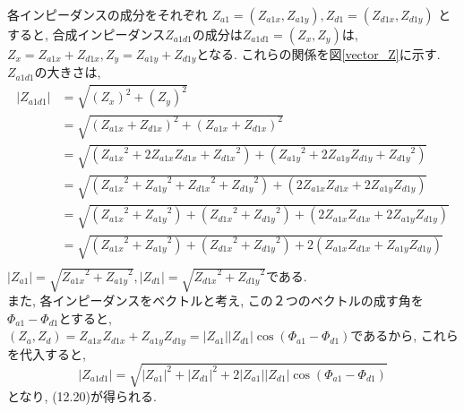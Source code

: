 \documentclass[fleqn,11pt,a4paper,dvipdfmx]{jsarticle}
\numberwithin{equation}{section}
\begin{document}
各インピーダンスの成分をそれぞれ
$Z_{a1} = \left(Z_{a1x} , Z_{a1y}\right) , Z_{d1} = \left(Z_{d1x} , Z_{d1y}\right) $
とすると, 合成インピーダンス$Z_{a1d1}$の成分は$Z_{a1d1} = \left(Z_x , Z_y\right)$は, 
$Z_x = Z_{a1x} + Z_{d1x} , Z_y = Z_{a1y} + Z_{d1y}$となる. これらの関係を図\ref{vector_Z}に示す. \\
$Z_{a1d1}$の大きさは,\\
\begin{align*}
  \left|Z_{a1d1}\right| & = \sqrt{ {\left(Z_x\right)}^2 + {\left(Z_y\right)}^2 }                                                                                            \\
                        & = \sqrt{ {\left(Z_{a1x} + Z_{d1x}\right)}^2 + {\left(Z_{a1x} + Z_{d1x}\right)}^2 }                                                                \\
                        & = \sqrt{ \left( {Z_{a1x}}^2 + 2Z_{a1x}Z_{d1x} + {Z_{d1x}}^2 \right) + \left( {Z_{a1y}}^2 + 2Z_{a1y}Z_{d1y} + {Z_{d1y}}^2 \right)}                 \\
                        & =  \sqrt{ \left( {Z_{a1x}}^2 + {Z_{a1y}}^2 + {Z_{d1x}}^2  + {Z_{d1y}}^2 \right) + \left(2Z_{a1x}Z_{d1x} + 2Z_{a1y}Z_{d1y}  \right)}               \\
                        & =  \sqrt{ \left( {Z_{a1x}}^2 + {Z_{a1y}}^2 \right) + \left({Z_{d1x}}^2  + {Z_{d1y}}^2 \right) + \left(2Z_{a1x}Z_{d1x} + 2Z_{a1y}Z_{d1y}  \right)} \\
                        & =  \sqrt{ \left( {Z_{a1x}}^2 + {Z_{a1y}}^2 \right) + \left({Z_{d1x}}^2  + {Z_{d1y}}^2 \right) + 2\left(Z_{a1x}Z_{d1x} + Z_{a1y}Z_{d1y}  \right)}  \\
\end{align*}
$\left|Z_{a1}\right| = \sqrt{{{Z_{a1x}}^2 + {Z_{a1y}}^2}},\left|Z_{d1}\right| = \sqrt{{{Z_{d1x}}^2 + {Z_{d1y}}^2}}$である. \\
また, 各インピーダンスをベクトルと考え, この２つのベクトルの成す角を$\Phi_{a1} - \Phi_{d1}$とすると, \\
$\left(Z_a , Z_d\right) = Z_{a1x}Z_{d1x} + Z_{a1y}Z_{d1y} = \left|Z_{a1}\right| \left|Z_{d1}\right| \cos \left(\Phi_{a1} - \Phi_{d1}\right)$であるから, 
これらを代入すると, 
\begin{equation*}
  \left|Z_{a1d1}\right| = \sqrt{ {\left|Z_{a1}\right|}^2 + {\left|Z_{d1}\right|}^2 + 2 \left|Z_{a1}\right| \left|Z_{d1}\right| \cos \left(\Phi_{a1} - \Phi_{d1}\right)}
\end{equation*}
となり, (12.20)が得られる. 
\end{document}
